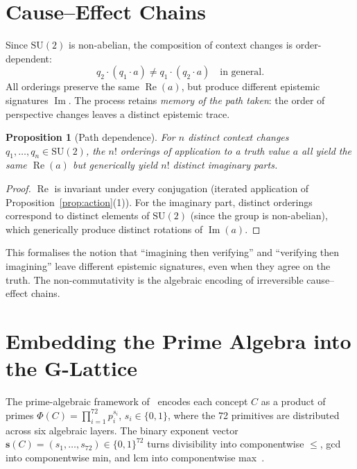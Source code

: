 \documentclass[11pt,a4paper]{article}
\newtheorem{proposition}[theorem]{Proposition}
\newcommand{\Real}{\operatorname{Re}}
\newcommand{\Imag}{\operatorname{Im}}
\newcommand{\SU}{\mathrm{SU}(2)}
\begin{document}
\section{Cause--Effect Chains}
\label{sec:cause}

Since $\SU$ is non-abelian, the composition of context changes is
order-dependent:
\[
  q_2\cdot(q_1\cdot a) \neq q_1\cdot(q_2\cdot a)
  \quad\text{in general.}
\]
All orderings preserve the same $\Real(a)$, but produce different
epistemic signatures $\Imag$. The process retains \emph{memory of
the path taken}: the order of perspective changes leaves a distinct
epistemic trace.

\begin{proposition}[Path dependence]
\label{prop:path}
For $n$ distinct context changes $q_1,\ldots,q_n\in\SU$, the $n!$
orderings of application to a truth value $a$ all yield the same
$\Real(a)$ but generically yield $n!$ distinct imaginary parts.
\end{proposition}

\begin{proof}
$\Real$ is invariant under every conjugation (iterated application
of Proposition~\ref{prop:action}(1)). For the imaginary part,
distinct orderings correspond to distinct elements of $\SU$ (since
the group is non-abelian), which generically produce distinct
rotations of $\Imag(a)$.
\end{proof}

This formalises the notion that ``imagining then verifying'' and
``verifying then imagining'' leave different epistemic signatures,
even when they agree on the truth. The non-commutativity is the
algebraic encoding of irreversible cause--effect chains.

\section{Embedding the Prime Algebra into the G-Lattice}
\label{sec:embedding}

The prime-algebraic framework of~\citet{p4} encodes each concept $C$
as a product of primes $\Phi(C)=\prod_{i=1}^{72}p_i^{s_i}$,
$s_i\in\{0,1\}$, where the 72 primitives are distributed across six
algebraic layers. The binary exponent vector
$\mathbf{s}(C)=(s_1,\ldots,s_{72})\in\{0,1\}^{72}$ turns
divisibility into componentwise $\leq$, gcd into componentwise min,
and lcm into componentwise max~\citep{birkhoff1967}.
\end{document}
